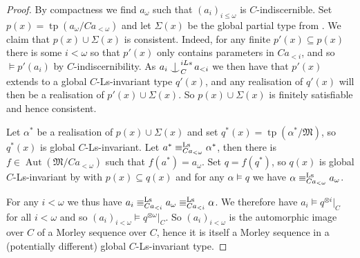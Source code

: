\documentclass[a4paper, reqno]{amsart}
\theoremstyle{definition}
\theoremstyle{repeat}
\newcommand{\MM}{\mathfrak{M}}
\DeclareMathOperator{\tp}{tp}
\DeclareMathOperator{\Aut}{Aut}
\newcommand{\equivls}{\equiv^\textup{Ls}}
\def\Ind#1#2{#1\setbox0=\hbox{$#1x$}\kern\wd0\hbox to 0pt{\hss$#1\mid$\hss}
\lower.9\ht0\hbox to 0pt{\hss$#1\smile$\hss}\kern\wd0}
\def\ind{\mathop{\mathpalette\Ind{}}}
\begin{document}
\begin{proof}
By compactness we find $a_\omega$ such that $(a_i)_{i \leq \omega}$ is $C$-indiscernible. Set $p(x) = \tp(a_\omega/C a_{< \omega})$ and let $\Sigma(x)$ be the global partial type from . We claim that $p(x) \cup \Sigma(x)$ is consistent. Indeed, for any finite $p'(x) \subseteq p(x)$ there is some $i < \omega$ so that $p'(x)$ only contains parameters in $C a_{<i}$, and so $\models p'(a_i)$ by $C$-indiscernibility. As $a_i \ind^{iLs}_C a_{<i}$ we then have that $p'(x)$ extends to a global $C$-Ls-invariant type $q'(x)$, and any realisation of $q'(x)$ will then be a realisation of $p'(x) \cup \Sigma(x)$. So $p(x) \cup \Sigma(x)$ is finitely satisfiable and hence consistent.

Let $\alpha^*$ be a realisation of $p(x) \cup \Sigma(x)$ and set $q^*(x) = \tp(\alpha^*/\MM)$, so $q^*(x)$ is global $C$-Ls-invariant. Let $a^* \equivls_{C a_{< \omega}} \alpha^*$, then there is $f \in \Aut(\MM/C a_{< \omega})$ such that $f(a^*) = a_\omega$. Set $q = f(q^*)$, so $q(x)$ is global $C$-Ls-invariant by \cite[Lemma 3.8(i)]{dobrowolski_kim-independence_2022} with $p(x) \subseteq q(x)$ and for any $\alpha \models q$ we have $\alpha \equivls_{C a_{< \omega}} a_\omega$.

For any $i < \omega$ we thus have $a_i \equivls_{C a_{<i}} a_\omega \equivls_{C a_{<i}} \alpha$. We therefore have $a_i \models q^{\otimes i}|_C$ for all $i < \omega$ and so $(a_i)_{i < \omega} \models q^{\otimes \omega}|_C$. So $(a_i)_{i < \omega}$ is the automorphic image over $C$ of a Morley sequence over $C$, hence it is itself a Morley sequence in a (potentially different) global $C$-Ls-invariant type.
\end{proof}
\end{document}
